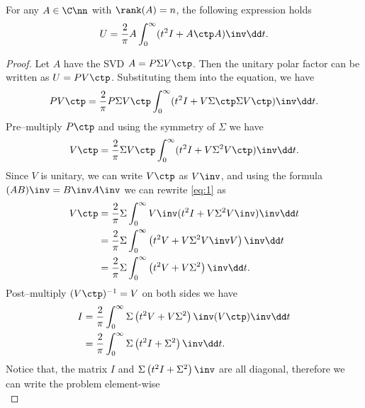 \documentclass{article}
\numberwithin{equation}{section} %
\begin{document}
\begin{theorem}
\label{thm:integralOfPolarFactor}
For any $A\in\C\nn$ with $\rank(A) = n$, the following expression holds
\begin{equation}
  \label{eq:proof2.3} 
  U = \frac{2}{\pi} A \int_0^\infty (t^2 I + A \ctp A)\inv \dd t.
\end{equation}
\end{theorem}

\begin{proof}
Let $A$ have the SVD $A = P\Sigma V\ctp$. Then the unitary polar factor can
be written as $U = PV\ctp$. Substituting them into the equation, we have
\begin{equation}
  \notag 
  PV\ctp  = \frac{2}{\pi} P\Sigma V\ctp \int_0^\infty (t^2 I + V\Sigma\ctp \Sigma V\ctp)\inv \dd t.
\end{equation}
Pre--multiply $P\ctp$ and using the symmetry of $\Sigma$ we have
\begin{equation}
  \label{eq:1} 
  V\ctp = \frac{2}{\pi} \Sigma V\ctp \int_0^\infty (t^2 I + V\Sigma^2 V\ctp)\inv \dd t.
\end{equation}
Since $V$ is unitary, we can write $V\ctp$ as $V\inv$, and using the
formula $(AB)\inv = B\inv A\inv$ we can rewrite \eqref{eq:1} as
\begin{equation}
  \notag 
  \begin{aligned}
    V\ctp &= \frac{2}{\pi} \Sigma \int_0^\infty V\inv (t^2 I + V\Sigma^2 V\inv)\inv \dd t\\
          & = \frac{2}{\pi}\Sigma\int_0^\infty \left(t^2 V + V\Sigma^2 V\inv V\right)\inv \dd t \\
          & = \frac{2}{\pi} \Sigma \int_0^\infty \left(t^2V + V\Sigma^2\right)\inv \dd t.
  \end{aligned}
\end{equation}
Post--multiply $(V\ctp)^{-1} = V$ on both sides we have
\begin{equation}
  \notag 
  \begin{aligned}
    I &= \frac{2}{\pi}\int_0^\infty \Sigma \left(t^2 V + V \Sigma^2 \right)\inv (V\ctp)\inv \dd t \\
      & = \frac{2}{\pi}\int_0^\infty \Sigma \left(t^2 I + \Sigma^2\right)\inv \dd t.
  \end{aligned}
\end{equation}
Notice that, the matrix $I$ and $\Sigma\left(t^2 I + \Sigma^2\right)\inv$
are all diagonal, therefore we can write the problem element-wise
\begin{equation}

\end{equation}
\end{proof}
\end{document}
